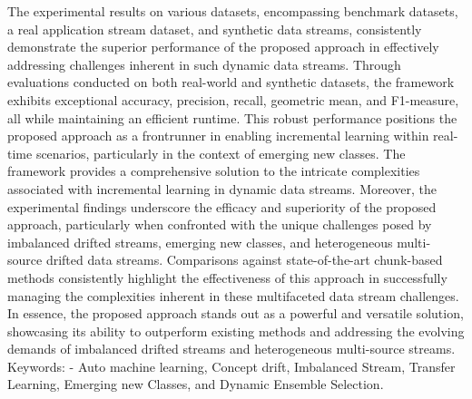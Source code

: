 \begin{alwayssingle}
    The experimental results on various datasets, encompassing benchmark datasets, a real application stream dataset, and synthetic data streams, consistently demonstrate the superior performance of the proposed approach in effectively addressing challenges inherent in such dynamic data streams. Through evaluations conducted on both real-world and synthetic datasets, the framework exhibits exceptional accuracy, precision, recall, geometric mean, and F1-measure, all while maintaining an efficient runtime.
    This robust performance positions the proposed approach as a frontrunner in enabling incremental learning within real-time scenarios, particularly in the context of emerging new classes. The framework provides a comprehensive solution to the intricate complexities associated with incremental learning in dynamic data streams. Moreover, the experimental findings underscore the efficacy and superiority of the proposed approach, particularly when confronted with the unique challenges posed by imbalanced drifted streams, emerging new classes, and heterogeneous multi-source drifted data streams.
    Comparisons against state-of-the-art chunk-based methods consistently highlight the effectiveness of this approach in successfully managing the complexities inherent in these multifaceted data stream challenges. In essence, the proposed approach stands out as a powerful and versatile solution, showcasing its ability to outperform existing methods and addressing the evolving demands of imbalanced drifted streams and heterogeneous multi-source streams.
    Keywords: - Auto machine learning, Concept drift, Imbalanced Stream, Transfer Learning, Emerging new Classes, and Dynamic Ensemble Selection.
    
\end{alwayssingle}




%
%



